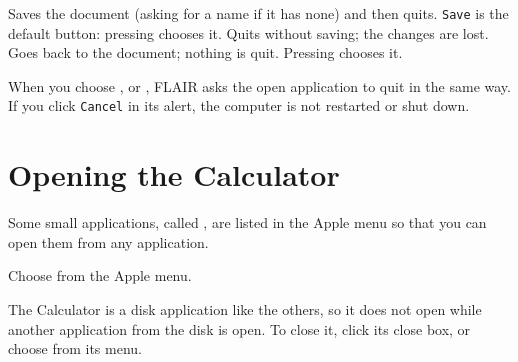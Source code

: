 
Saves the document (asking for a name if it has none) and
then quits.  \texttt{Save} is the default button: pressing 
chooses it.
Quits without saving; the changes are lost.
Goes back to the document; nothing is quit.  Pressing
 chooses it.

When you choose ,  or , FLAIR asks the open application to quit in the same way.
If you click \texttt{Cancel} in its alert, the computer is not restarted or
shut down.

\section{Opening the Calculator}
Some small applications, called , are listed in the
Apple menu so that you can open them from any application.
\begin{TaskSteps}
\Step Choose  from the Apple menu.
\end{TaskSteps}


The Calculator is a disk application like the others, so it does not open
while another application from the disk is open.  To close it, click its
close box, or choose  from its  menu.
